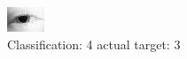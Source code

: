 \begin{figure}[h!]
\begin{center}
\includegraphics[width=0.60\columnwidth]{figures/ID164_class_4_target_3.png}
\end{center}
\caption{ Classification: 4 actual target: 3}
\label{fig:ID164_class_4_target_3}
\end{figure}
